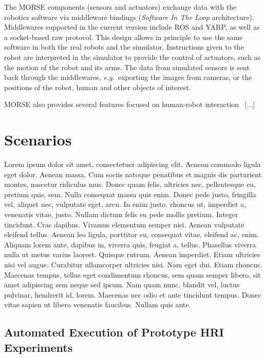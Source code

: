 \documentclass[conference]{IEEEtran}
\newcommand{\eg}{{\textit{e.g.~}}}
\begin{document}
The MORSE components (sensors and actuators) exchange data with the robotics
software via middleware bindings (\emph{Software In The Loop} architecture).
Middlewares supported in the current version include ROS and YARP, as well as a
socket-based raw protocol. This design allows in principle to use the same
software in both the real robots and the simulator. Instructions given to the
robot are interpreted in the simulator to provide the control of actuators, such
as the motion of the robot and its arms.  The data from simulated sensors is
sent back through the middlewares, \eg exporting the images from cameras, or the
positions of the robot, human and other objects of interest.

MORSE also provides several features focused on human-robot
interaction~\cite{lemaignan2012morse} [...]

\section{Scenarios}

Lorem ipsum dolor sit amet, consectetuer adipiscing elit. Aenean commodo ligula
eget dolor. Aenean massa. Cum sociis natoque penatibus et magnis dis parturient
montes, nascetur ridiculus mus. Donec quam felis, ultricies nec, pellentesque
eu, pretium quis, sem. Nulla consequat massa quis enim. Donec pede justo,
fringilla vel, aliquet nec, vulputate eget, arcu. In enim justo, rhoncus ut,
imperdiet a, venenatis vitae, justo. Nullam dictum felis eu pede mollis pretium.
Integer tincidunt. Cras dapibus. Vivamus elementum semper nisi. Aenean vulputate
eleifend tellus. Aenean leo ligula, porttitor eu, consequat vitae, eleifend ac,
enim. Aliquam lorem ante, dapibus in, viverra quis, feugiat a, tellus. Phasellus
viverra nulla ut metus varius laoreet. Quisque rutrum. Aenean imperdiet. Etiam
ultricies nisi vel augue. Curabitur ullamcorper ultricies nisi. Nam eget dui.
Etiam rhoncus. Maecenas tempus, tellus eget condimentum rhoncus, sem quam semper
libero, sit amet adipiscing sem neque sed ipsum. Nam quam nunc, blandit vel,
luctus pulvinar, hendrerit id, lorem. Maecenas nec odio et ante tincidunt
tempus. Donec vitae sapien ut libero venenatis faucibus. Nullam quis ante. 

\subsection{Automated Execution of Prototype HRI Experiments}
\label{scenario1}
\end{document}
